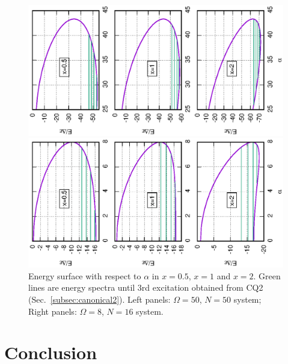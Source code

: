 \documentclass[%
superscriptaddress,
preprint,
showpacs,
nofootinbib,
amsmath,amssymb,
prc,
floatfix ]%
{revtex4-1}
\begin{document}
\begin{figure}[htbp]
 \begin{minipage}{0.45\hsize}
 \begin{center}
  \includegraphics[width=130mm,angle=-90]{images/N50gap_E.eps}
 \end{center}
 \end{minipage}
 \begin{minipage}{0.45\hsize}
 \begin{center}
  \includegraphics[width=130mm,angle=-90]{images/N16gap_E.eps}
 \end{center}
\end{minipage}
 \caption{Energy surface with respect to $\alpha$ in $x=0.5$, $x=1$ and $x=2$. 
Green lines are energy spectra until 3rd excitation obtained from CQ2 
(Sec.~\ref{subsec:canonical2}). Left panels: $\Omega=50$, $N=50$ system;
 Right panels: $\Omega=8$, $N=16$ system.}
 \label{fig:Delta_E}
\end{figure}

\newpage


\section{Conclusion}
\end{document}
